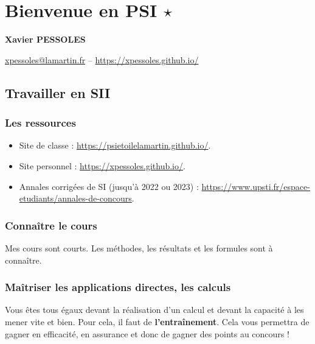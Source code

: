 \renewcommand{\repExo}{\repRel/PSI_Cy_01_ModelisationSystemes/Ch_02_RevisionsSLCI/}
\renewcommand{\nomExo}{01_Modelisation_Perf_Fiche}
\graphicspath{{\repStyle/png}{\repExo\nomExo/images}}
%


\setchapterpreamble[u]{\margintoc}

\chapter*{Bienvenue en PSI $\star$}
\setcounter{chapter}{1}

\begin{center}
\Large
\textsf{\textbf{Xavier PESSOLES}}
\normalsize 

\vspace{.5cm} 

\url{xpessoles@lamartin.fr} -- \url{https://xpessoles.github.io/}
\normalsize
\end{center}
\section{Travailler en SII}
\subsection{Les ressources}
\begin{itemize}
\item Site de classe :  \url{https://psietoilelamartin.github.io/}.
\item Site personnel : \url{https://xpessoles.github.io/}.
\item Annales corrigées de SI (jusqu'à 2022 ou 2023) : \url{https://www.upsti.fr/espace-etudiants/annales-de-concours}. 

\end{itemize}
\subsection{Connaître le cours}
Mes cours sont courts. Les méthodes, les résultats et les formules sont à connaître. 

\subsection{Maîtriser les applications directes, les calculs}
Vous êtes tous égaux devant la réalisation d'un calcul et devant la capacité à les mener vite et bien. 
Pour cela, il faut de \textbf{l’entraînement}. Cela vous permettra de gagner en efficacité, en assurance et donc de gagner des points au concours !


